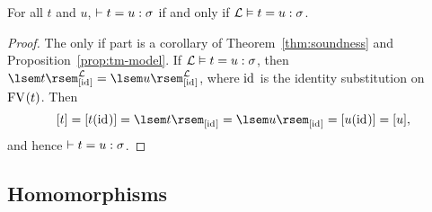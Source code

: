 \begin{thm} \label{prop:term-model-satisfaction}
For all $t$ and $u$, $\vdash t = u : \sigma$ if and only if $\mathcal{L} \vDash t = u : \sigma$. 
\begin{proof}
The only if part is a corollary of Theorem~\ref{thm:soundness} and Proposition~\ref{prop:tm-model}. If $\mathcal{L} \vDash t = u : \sigma$, then $\sint[\tmmod]{t}{[\idsub]} = \sint[\tmmod]{u}{[\idsub]}$, where $\mathrm{id}_{}$ is the identity substitution on $\mathrm{FV}_{}(t)$. Then
\[ [t] = [\subst{t}{(\idsub)}] = \sint{t}{[\idsub]} = \sint{u}{[\idsub]}
    = [\subst{u}{(\idsub)}] = [u], \]
and hence $\vdash t = u : \sigma$.
\end{proof}
\end{thm}

\begin{comment}
NOTE: product structure is only a model of all the components of the two factors are nonempty.

\begin{def}[Product of models]
Let $\struct{A}$ and $\struct{B}$ be models. The \emph{product model} $\cprod{\struct{A}}{\struct{B}}$ is defined as follows:
\begin{items}
\item $(\cprod{\struct{A}}{\struct{B}})_\sigma = \cartprod{\scomp{\struct{A}}{\sigma}}{\scomp{\struct{B}}{\sigma}}$;
\item $\sapp[\sigma,\tau][\cprod{\struct{A}}{\struct{B}}]((f, g), (x, y))
        = (\sapp[\sigma,\tau][\struct{A}](f, x), \sapp[\sigma,\tau][\struct{B}](g, y))$;
\item $\sint[\cprod{\struct{A}}{\struct{B}}]{t}{\rho}
        = (\sint[\struct{A}]{t}{\rho}, \sint[\struct{B}]{t}{\rho})$.
\end{items}
\end{def}

\begin{prop}
If $\scomp{\struct{A}}{\sigma}$ and $\scomp{\struct{B}}{\sigma}$ are nonempty for all $\sigma \in \Ty$, then $\cprod{\struct{A}}{\struct{B}}$ is a model.
\begin{proof}
Extensionality: if $(f, g)(x, y) = (f', g')(x, y)$ for all $x, y$, then $(fx, gy) = (f'x, g'y)$ for all $x, y$, i.e. $fx = f'x$ and $gy = g'y$ for all
\end{proof}
\end{prop}
\end{comment}

\subsection{Homomorphisms}

